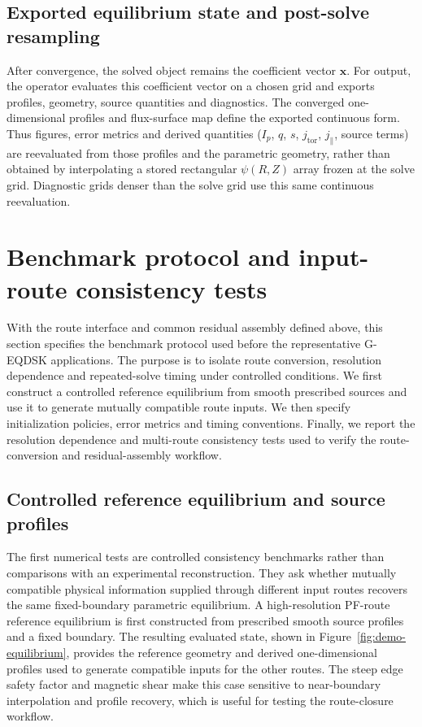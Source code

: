 \documentclass[final, 3p, times]{elsarticle}
\begin{document}
\subsection{Exported equilibrium state and post-solve resampling}

After convergence, the solved object remains the coefficient vector $\mathbf{x}$. For output, the operator evaluates this coefficient vector on a chosen grid and exports profiles, geometry, source quantities and diagnostics. The converged one-dimensional profiles and flux-surface map define the exported continuous form. Thus figures, error metrics and derived quantities ($I_p$, $q$, $s$, $j_{\mathrm{tor}}$, $j_{\parallel}$, source terms) are reevaluated from those profiles and the parametric geometry, rather than obtained by interpolating a stored rectangular $\psi(R,Z)$ array frozen at the solve grid. Diagnostic grids denser than the solve grid use this same continuous reevaluation.

\section{Benchmark protocol and input-route consistency tests}
\label{sec:benchmark}

With the route interface and common residual assembly defined above, this section specifies the benchmark protocol used before the representative G-EQDSK applications. The purpose is to isolate route conversion, resolution dependence and repeated-solve timing under controlled conditions. We first construct a controlled reference equilibrium from smooth prescribed sources and use it to generate mutually compatible route inputs. We then specify initialization policies, error metrics and timing conventions. Finally, we report the resolution dependence and multi-route consistency tests used to verify the route-conversion and residual-assembly workflow.

\subsection{Controlled reference equilibrium and source profiles}

The first numerical tests are controlled consistency benchmarks rather than comparisons with an experimental reconstruction. They ask whether mutually compatible physical information supplied through different input routes recovers the same fixed-boundary parametric equilibrium. A high-resolution PF-route reference equilibrium is first constructed from prescribed smooth source profiles and a fixed boundary. The resulting evaluated state, shown in Figure~\ref{fig:demo-equilibrium}, provides the reference geometry and derived one-dimensional profiles used to generate compatible inputs for the other routes. The steep edge safety factor and magnetic shear make this case sensitive to near-boundary interpolation and profile recovery, which is useful for testing the route-closure workflow.
\end{document}
